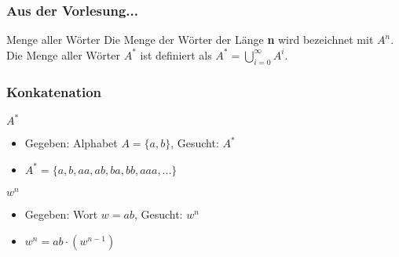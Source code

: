 \begin{frame}
	\frametitle{Aus der Vorlesung...}
	\begin{block}{Menge aller Wörter}
	Die Menge der Wörter der Länge \textbf{n} wird bezeichnet mit $A^n$. Die Menge aller Wörter $A^*$ ist definiert als $A^* = \bigcup^{\infty}_{i=0} A^i$.
	\end{block}

\end{frame}

\begin{frame}
	\frametitle{Konkatenation}
	\begin{block}{$A^*$}
		\begin{itemize}
			\item Gegeben: Alphabet $A = \{a, b\}$, Gesucht: $A^*$
			\item $A^* = \{a, b, aa, ab, ba, bb, aaa, ...\}$
		\end{itemize}
	\end{block}

	\begin{block}{$w^n$}
		\begin{itemize}
			\item Gegeben: Wort $w = ab$, Gesucht: $w^n$ \pause
			\item $w^n = ab \cdot (w^{n-1})$
		\end{itemize}
	\end{block}
\end{frame}

